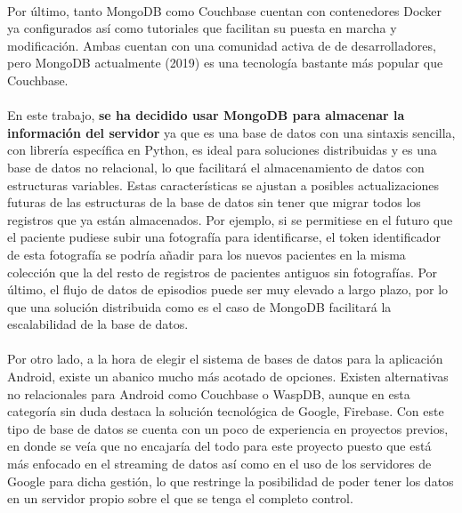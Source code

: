 \begin{itemize}
\paragraph{}
Por último, tanto MongoDB como Couchbase cuentan con contenedores Docker ya configurados así como tutoriales que facilitan su puesta en marcha y modificación. Ambas cuentan con una comunidad activa de de desarrolladores, pero MongoDB actualmente (2019) es una tecnología bastante más popular que Couchbase.
\end{itemize}

\paragraph{}
En este trabajo, \textbf{se ha decidido usar MongoDB para almacenar la información del servidor} ya que es una base de datos con una sintaxis sencilla, con librería específica en Python, es ideal para soluciones distribuidas y es una base de datos no relacional, lo que facilitará el almacenamiento de datos con estructuras variables. Estas características se ajustan a posibles actualizaciones futuras de las estructuras de la base de datos sin tener que migrar todos los registros que ya están almacenados. Por ejemplo, si se permitiese en el futuro que el paciente pudiese subir una fotografía para identificarse, el token identificador de esta fotografía se podría añadir para los nuevos pacientes en la misma colección que la del resto de registros de pacientes antiguos sin fotografías. Por último, el flujo de datos de episodios puede ser muy elevado a largo plazo, por lo que una solución distribuida como es el caso de MongoDB facilitará la escalabilidad de la base de datos.

\paragraph{}
Por otro lado, a la hora de elegir el sistema de bases de datos para la aplicación Android, existe un abanico mucho más acotado de opciones. Existen alternativas no relacionales para Android como Couchbase o WaspDB, aunque en esta categoría sin duda destaca la solución tecnológica de Google, Firebase. Con este tipo de base de datos se cuenta con un poco de experiencia en proyectos previos, en donde se veía que no encajaría del todo para este proyecto puesto que está más enfocado en el streaming de datos así como en el uso de los servidores de Google para dicha gestión, lo que restringe la posibilidad de poder tener los datos en un servidor propio sobre el que se tenga el completo control.

